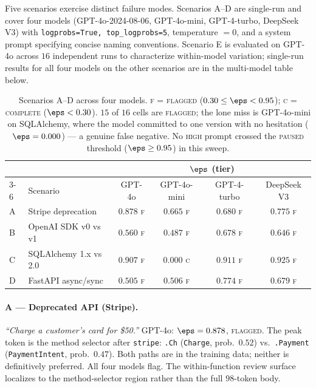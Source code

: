 Five scenarios exercise distinct failure modes. Scenarios A--D are
single-run and cover four models (GPT-4o-2024-08-06, GPT-4o-mini,
GPT-4-turbo, DeepSeek V3) with \texttt{logprobs=True,
top\_logprobs=5}, temperature $= 0$, and a system prompt specifying
concise naming conventions. Scenario E is evaluated on GPT-4o across
$16$ independent runs to characterize within-model variation;
single-run results for all four models on the other scenarios are in
the multi-model table below.

\begin{table}[h]
\centering
\small
\begin{tabular}{llcccc}
\toprule
 & & \multicolumn{4}{c}{$\eps$ (tier)} \\
\cmidrule(lr){3-6}
 & Scenario & GPT-4o & GPT-4o-mini & GPT-4-turbo & DeepSeek V3 \\
\midrule
A & Stripe deprecation        & $0.878$ \textsc{f} & $0.665$ \textsc{f} & $0.680$ \textsc{f} & $0.775$ \textsc{f} \\
B & OpenAI SDK v0 vs v1       & $0.560$ \textsc{f} & $0.487$ \textsc{f} & $0.678$ \textsc{f} & $0.646$ \textsc{f} \\
C & SQLAlchemy 1.x vs 2.0     & $0.907$ \textsc{f} & $\mathbf{0.000}$ \textsc{c} & $0.911$ \textsc{f} & $0.925$ \textsc{f} \\
D & FastAPI async/sync        & $0.505$ \textsc{f} & $0.506$ \textsc{f} & $0.774$ \textsc{f} & $0.679$ \textsc{f} \\
\bottomrule
\end{tabular}
\caption{Scenarios A--D across four models. \textsc{f} =
\textsc{flagged} ($0.30 \le \eps < 0.95$); \textsc{c} =
\textsc{complete} ($\eps < 0.30$). $15$ of $16$ cells are
\textsc{flagged}; the lone miss is GPT-4o-mini on SQLAlchemy, where
the model committed to one version with no hesitation ($\eps =
0.000$) --- a genuine false negative. No \textsc{high} prompt
crossed the \textsc{paused} threshold ($\eps \ge 0.95$) in this
sweep.}
\label{tab:scenarios-multimodel}
\end{table}

\paragraph{A --- Deprecated API (Stripe).}
\textit{``Charge a customer's card for \$50.''} GPT-4o: $\eps =
0.878$, \textsc{flagged}. The peak token is the method selector
after \texttt{stripe}: \texttt{.Ch} (\texttt{Charge}, prob.\ $0.52$)
vs.\ \texttt{.Payment} (\texttt{PaymentIntent}, prob.\ $0.47$). Both
paths are in the training data; neither is definitively preferred.
All four models flag. The within-function review surface localizes
to the method-selector region rather than the full $98$-token body.

